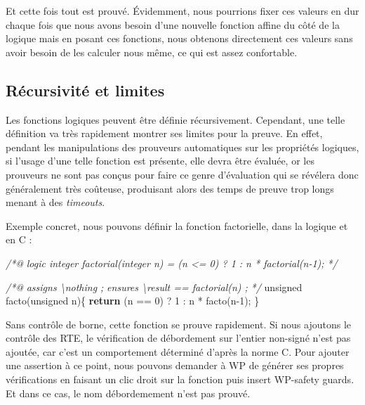 \documentclass[12pt,francais,]{scrbook}
\newenvironment{Shaded}{}{}
\newcommand{\KeywordTok}[1]{\textcolor[rgb]{0.00,0.44,0.13}{\textbf{{#1}}}}
\newcommand{\DataTypeTok}[1]{\textcolor[rgb]{0.56,0.13,0.00}{{#1}}}
\newcommand{\DecValTok}[1]{\textcolor[rgb]{0.25,0.63,0.44}{{#1}}}
\newcommand{\CommentTok}[1]{\textcolor[rgb]{0.38,0.63,0.69}{\textit{{#1}}}}
\newcommand{\NormalTok}[1]{{#1}}
\begin{document}
Et cette fois tout est prouvé. Évidemment, nous pourrions fixer ces
valeurs en dur chaque fois que nous avons besoin d'une nouvelle fonction
affine du côté de la logique mais en posant ces fonctions, nous obtenons
directement ces valeurs sans avoir besoin de les calculer nous même, ce
qui est assez confortable.

\subsection{Récursivité et limites}\label{ruxe9cursivituxe9-et-limites}

Les fonctions logiques peuvent être définie récursivement. Cependant,
une telle définition va très rapidement montrer ses limites pour la
preuve. En effet, pendant les manipulations des prouveurs automatiques
sur les propriétés logiques, si l'usage d'une telle fonction est
présente, elle devra être évaluée, or les prouveurs ne sont pas conçus
pour faire ce genre d'évaluation qui se révélera donc généralement très
coûteuse, produisant alors des temps de preuve trop longs menant à des
\emph{timeouts}.

Exemple concret, nous pouvons définir la fonction factorielle, dans la
logique et en C :

\begin{footnotesize}\begin{Shaded}
\begin{Highlighting}[]
\CommentTok{/*@}
\CommentTok{  logic integer factorial(integer n) = (n <= 0) ? 1 : n * factorial(n-1);}
\CommentTok{*/}

\CommentTok{/*@ }
\CommentTok{  assigns \textbackslash{}nothing ;}
\CommentTok{  ensures \textbackslash{}result == factorial(n) ; }
\CommentTok{*/}
\DataTypeTok{unsigned} \NormalTok{facto(}\DataTypeTok{unsigned} \NormalTok{n)\{}
  \KeywordTok{return} \NormalTok{(n == }\DecValTok{0}\NormalTok{) ? }\DecValTok{1} \NormalTok{: n * facto(n}\DecValTok{-1}\NormalTok{);}
\NormalTok{\}}
\end{Highlighting}
\end{Shaded}\end{footnotesize}

Sans contrôle de borne, cette fonction se prouve rapidement. Si nous
ajoutons le contrôle des RTE, le vérification de débordement sur
l'entier non-signé n'est pas ajoutée, car c'est un comportement
déterminé d'après la norme C. Pour ajouter une assertion à ce point,
nous pouvons demander à WP de générer ses propres vérifications en
faisant un clic droit sur la fonction puis \og{}insert WP-safety guards\fg{}.
Et dans ce cas, le nom débordemement n'est pas prouvé.
\end{document}
